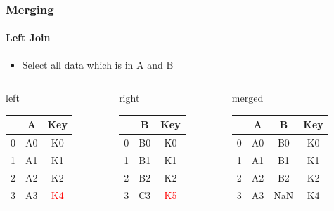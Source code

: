 \documentclass[12pt,ngerman]{beamer}
\def\firstcircle{(0,0) circle (2cm)}
\def\secondcircle{(0:3cm) circle (2cm)}
\begin{document}
\begin{frame}
\frametitle{Merging}
\framesubtitle{Left Join}

\begin{itemize}
\item Select all data which is in A and B
\end{itemize}

\begin{center}
\end{center}

{\footnotesize
\begin{columns}
\begin{column}{0.3\textwidth}
left \\
\begin{tabular}{c|cc} \toprule
   & A  &  Key \\ \midrule
0 & A0 &  K0 \\
1 & A1 &  K1 \\ 
2 & A2 &  K2 \\
3 & A3 &  \textcolor{red}{K4} \\ \bottomrule
\end{tabular}
\end{column}
\begin{column}{0.3\textwidth}
right \\
\begin{tabular}{c|cc} \toprule
   &  B   & Key \\ \midrule
0 &  B0 & K0 \\
1 &  B1 & K1 \\ 
2 &  B2 & K2 \\
3 &  C3 & \textcolor{red}{K5} \\ \bottomrule
\end{tabular}\end{column}
\begin{column}{0.3\textwidth}
merged \\
\begin{tabular}{c|ccc} \toprule
   & A  & B   & Key \\ \midrule
0 & A0 & B0 & K0 \\
1 & A1 & B1 & K1 \\ 
2 & A2 & B2 & K2 \\ \bottomrule
3 & A3 & NaN & K4 \\ \bottomrule
\end{tabular} \\
\vspace*{0.4em}
\end{column}
\end{columns}}

\end{frame}
\end{document}
